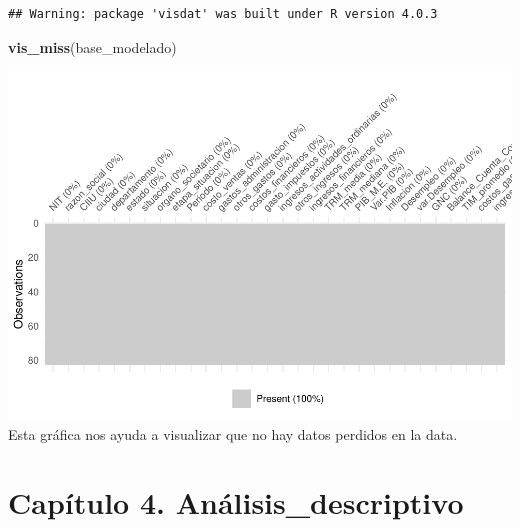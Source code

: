 \documentclass[
  11pt,
]{book}
\newenvironment{Shaded}{\begin{snugshade}}{\end{snugshade}}
\newcommand{\DataTypeTok}[1]{\textcolor[rgb]{0.13,0.29,0.53}{#1}}
\newcommand{\KeywordTok}[1]{\textcolor[rgb]{0.13,0.29,0.53}{\textbf{#1}}}
\newcommand{\NormalTok}[1]{#1}
\newcommand{\OperatorTok}[1]{\textcolor[rgb]{0.81,0.36,0.00}{\textbf{#1}}}
\newcommand{\StringTok}[1]{\textcolor[rgb]{0.31,0.60,0.02}{#1}}
\begin{document}
\begin{verbatim}
## Warning: package 'visdat' was built under R version 4.0.3
\end{verbatim}

\begin{Shaded}
\begin{Highlighting}[]
\KeywordTok{vis_miss}\NormalTok{(base_modelado)}
\end{Highlighting}
\end{Shaded}

\includegraphics{index_files/figure-latex/unnamed-chunk-4-1.pdf} Esta
gráfica nos ayuda a visualizar que no hay datos perdidos en la data.

\hypertarget{capuxedtulo-4.-anuxe1lisis_descriptivo}{%
\chapter{Capítulo 4.
Análisis\_descriptivo}\label{capuxedtulo-4.-anuxe1lisis_descriptivo}}

\begin{Shaded}
\end{Shaded}
\end{document}
